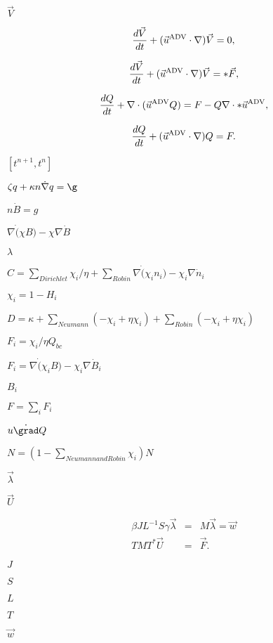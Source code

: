 \documentclass{article}
\begin{document}
$ \vec{V} $
\pagebreak

\[ \frac{d\vec{V}}{dt} + (\vec{u}^{\mbox{\scriptsize ADV}} \cdot \nabla)\vec{V} = 0, \]
\pagebreak

\[ \frac{d\vec{V}}{dt} + (\vec{u}^{\mbox{\scriptsize ADV}} \cdot \nabla)\vec{V} = *\vec{F}, \]
\pagebreak

\[ \frac{dQ}{dt} + \nabla \cdot (\vec{u}^{\mbox{\scriptsize ADV}} Q) = F - Q \nabla \cdot *\vec{u}^{\mbox{\scriptsize ADV}}, \]
\pagebreak

\[ \frac{dQ}{dt} + (\vec{u}^{\mbox{\scriptsize ADV}} \cdot \nabla) Q = F. \]
\pagebreak

$ [t^{n+1}, t^n] $
\pagebreak

$ \zeta q + \kappa n \dot \nabla q = \g $
\pagebreak

$ n \dot B = g $
\pagebreak

$ \nabla \dot (\chi B) - \chi \nabla \dot B $
\pagebreak

$\lambda$
\pagebreak

$ C = \sum_{Dirichlet} \chi_i/\eta + \sum_{Robin} \nabla \dot (\chi_i n_i) - \chi_i \nabla \dot n_i$
\pagebreak

$\chi_i = 1-H_i$
\pagebreak

$ D = \kappa + \sum_{Neumann} (-\chi_i + \eta \chi_i) + \sum_{Robin} (-\chi_i + \eta \chi_i)$
\pagebreak

$ F_i = \chi_i/\eta Q_{bc}$
\pagebreak

$ F_i = \nabla \dot (\chi_i B) - \chi_i \nabla \dot B_i $
\pagebreak

$B_i$
\pagebreak

$F = \sum_{i} F_i$
\pagebreak

$ u \dot \grad Q$
\pagebreak

$ N = (1-\sum_{Neumann and Robin} \chi_i) N$
\pagebreak

$ \vec{\lambda}$
\pagebreak

$ \vec{U}$
\pagebreak

\begin{eqnarray*} \beta J L^{-1} S \gamma \vec{\lambda} &=& M \vec{\lambda} = \vec{w} \\ T M T^* \vec{U} &=& \vec{F}. \end{eqnarray*}
\pagebreak

$ J $
\pagebreak

$ S $
\pagebreak

$ L $
\pagebreak

$ T $
\pagebreak

$ \vec{w} $
\pagebreak
\end{document}
